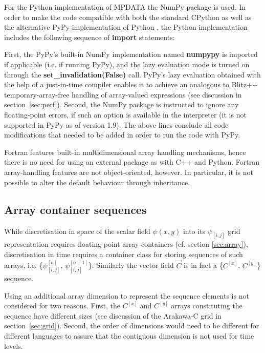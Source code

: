 \documentclass[final,5p,times,twocolumn]{elsarticle}
\newcounter{lstnopyt}
\newcounter{linenopyt}
\newcommand*\FancyVerbStartString{}
\newcommand*\FancyVerbStopString{}
\newcommand{\codepyt}[4]{%
  \addtocounter{lstnopyt}{1}%
  \renewcommand*\FancyVerbStartString{\PY{c}{\PYZsh{}#2}}
  \renewcommand*\FancyVerbStopString{\PY{c}{\PYZsh{}#3}}
  \setcounter{FancyVerbLine}{\thelinenopyt}%
  \fvset{label={listing~P.\thelstnopyt~(Python)},rulecolor=\color{blue},stepnumber=#4}%
  \setcounter{linenopyt}{\value{FancyVerbLine}}%
}
\newcommand{\prog}[1]{{\rm\bf#1}}
\begin{document}
  For the Python implementation of MPDATA the NumPy package is used.
  In order to make the code compatible with both the standard CPython
    as well as the alternative PyPy implementation of Python \citep[][]{Bolz_et_al_2011},
    the Python implementation includes the following sequence of \prog{import} statements:
  \codepyt{code/pyt/listings.py}{listing02}{listing03}{1}
  First, the PyPy's built-in NumPy implementation named \prog{numpypy} is imported if applicable (i.e. if running PyPy), 
    and the lazy evaluation mode is turned on through the \prog{set\_invalidation(False)} call.
  PyPy's lazy evaluation obtained with the help of a just-in-time compiler enables it to achieve
    an analogous to Blitz++ temporary-array-free handling of array-valued expressions 
    (see discussion in section~\ref{sec:perf}).
  Second, the NumPy package is instructed to ignore any floating-point errors, if such an option
    is available in the interpreter (it is not supported in PyPy as of version 1.9).
  The above lines conclude all code modifications that needed to be added in order to run
    the code with PyPy.

  Fortran features built-in multidimensional array handling mechanisms,
    hence there is no need for using an external package as with C++ and Python.
  Fortran array-handling features are not object-oriented, however.
  In particular, it is not possible to alter the default behaviour through
    inheritance.

  \subsection{Array container sequences}\label{sec:sequence}

  While discretisation in space of the scalar field $\psi(x,y)$ into its $\psi_{[i,j]}$ 
    grid representation requires floating-point array containers (cf. section \ref{sec:array}), 
    discretisation in time requires a container class for storing
    sequences of such arrays, i.e. \{$\psi_{[i,j]}^{[n]}$, $\psi_{[i,j]}^{[n+1]}$\}.
  Similarly the vector field $\vec{C}$ is in fact a \{$C^{[x]}$, $C^{[y]}$\} sequence.
 
  Using an additional array dimension to represent the sequence elements is not considered for two reasons.
  First, the $C^{[x]}$ and $C^{[y]}$ arrays constituting the sequence have different sizes
    (see discussion of the Arakawa-C grid in section~\ref{sec:grid}).
  Second, the order of dimensions would need to be different for different languages to assure that
      the contiguous dimension is not used for time levels.
\end{document}
